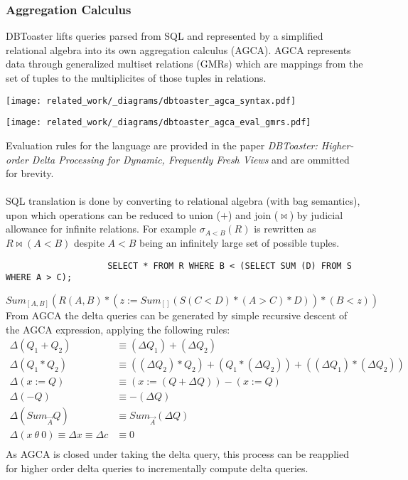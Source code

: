 \subsubsection{Aggregation Calculus}
DBToaster lifts queries parsed from SQL and represented by a simplified relational algebra into its own aggregation calculus (AGCA). AGCA represents data through generalized multiset relations (GMRs) which are mappings from the set of tuples to the multiplicites of those tuples in relations.
\begin{center}
    \texttt{[image: related\_work/\_diagrams/dbtoaster\_agca\_syntax.pdf]}
\end{center}
\begin{center}
    \texttt{[image: related\_work/\_diagrams/dbtoaster\_agca\_eval\_gmrs.pdf]}
\end{center}
Evaluation rules for the language are provided in the paper \textit{DBToaster: Higher-order Delta Processing for Dynamic, Frequently Fresh Views}\cite{DBToasterHigherOrderDeltaProcessing} and are ommitted for brevity.
\\
\\ SQL translation is done by converting to relational algebra (with bag semantics), upon which operations can be reduced to union ($+$) and join ($\bowtie$) by judicial allowance for infinite relations. For example $\sigma_{A<B}(R)$ is rewritten as $R \bowtie (A < B)$ despite $A < B$ being an infinitely large set of possible tuples.
\begin{verbatim}
                    SELECT * FROM R WHERE B < (SELECT SUM (D) FROM S WHERE A > C);
\end{verbatim}
\[Sum_{[A,B]}(R(A,B) \ast (z := Sum_{[]}(S(C<D) \ast (A > C) \ast D)) \ast (B < z))\]
From AGCA the delta queries can be generated by simple recursive descent of the AGCA expression, applying the following rules:
\[
    \begin{split}
        \Delta(Q_1 + Q_2) & \equiv (\Delta Q_1) + (\Delta Q_2) \\
        \Delta(Q_1 \ast Q_2) & \equiv ((\Delta Q_2) \ast Q_2) + (Q_1 \ast (\Delta Q_2)) + ((\Delta Q_1) \ast (\Delta Q_2)) \\
        \Delta (x := Q) & \equiv (x := (Q + \Delta Q)) - (x := Q) \\
        \Delta (-Q) & \equiv - (\Delta Q) \\
        \Delta(Sum_{\overrightarrow{A}}Q) & \equiv Sum_{\overrightarrow{A}}(\Delta Q) \\
        \Delta ( x \ \theta \ 0) \equiv \Delta x \equiv \Delta c & \equiv 0 \\
    \end{split}
\]
As AGCA is closed under taking the delta query, this process can be reapplied for higher order delta queries to incrementally compute delta queries.
